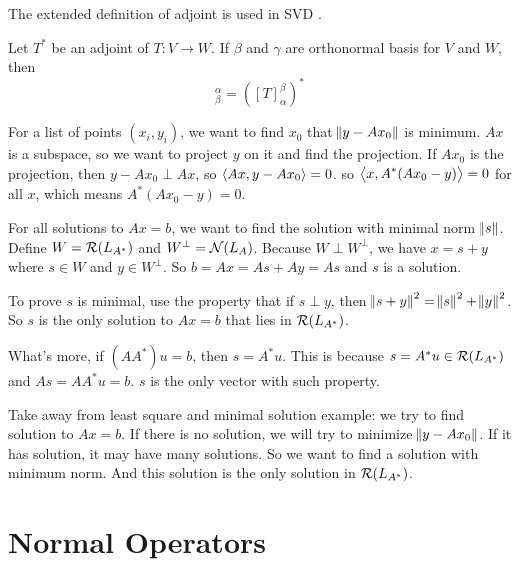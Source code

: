 The extended definition of adjoint is used in SVD .

\begin{theorem}
    Let $T^*$ be an adjoint of $T: V \rightarrow W$. If $\beta$ and $\gamma$ are orthonormal basis for $V$ and $W$, then
    \begin{equation}
        [T^*]_\beta^\alpha = \left( [T]_\alpha^\beta \right)^*
    \end{equation}
\end{theorem}



\begin{example}
    For a list of points $(x_i, y_i)$, we want to find $x_0$ that $\norm{y - Ax_0}$ is minimum. $Ax$ is a subspace, so we want to project $y$ on it and find the projection. If $Ax_0$ is the projection, then $y - Ax_0 \perp Ax$, so $\left\langle \displaystyle Ax, y - Ax_0 \right\rangle = 0$. so $\left\langle \displaystyle x, A^* (Ax_0 - y) \right\rangle = 0$ for all $x$, which means $A^* (Ax_0 - y) = 0$.
\end{example}

\begin{example}
    For all solutions to $Ax=b$, we want to find the solution with minimal norm $\norm{s}$. Define $W = \mathcal{R}(L_{A^*})$ and $W^\perp = \mathcal{N}(L_A)$. Because $W \perp W^\perp$, we have $x = s + y$ where $s \in W$ and $y \in W^\perp$. So $b = Ax = As + Ay = As$ and $s$ is a solution.
    
    To prove $s$ is minimal, use the property that if $s \perp y$, then $\norm{s+y}^2 = \norm{s}^2 + \norm{y}^2$. So $s$ is the only solution to $Ax=b$ that lies in $\mathcal{R}(L_{A^*})$.
    
    What's more, if $(AA^*)u = b$, then $s = A^* u$. This is because $s = A^* u \in \mathcal{R}(L_{A^*})$ and $As = AA^*u = b$. $s$ is the only vector with such property.
\end{example}

Take away from least square and minimal solution example: we try to find solution to $Ax = b$. If there is no solution, we will try to minimize $\norm{y - A x_0}$. If it has solution, it may have many solutions. So we want to find a solution with minimum norm. And this solution is the only solution in $\mathcal{R}(L_{A^*})$.




\section{Normal Operators}

